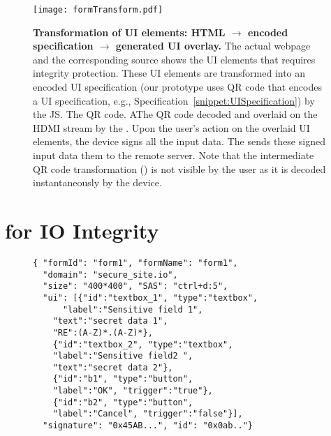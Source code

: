 \begin{figure*}[t]
\centering
\texttt{[image: formTransform.pdf]}
\caption{\textbf{Transformation of UI elements: HTML $\rightarrow$ encoded specification $\rightarrow$ \device generated UI overlay.} \one The actual webpage and the corresponding \html source shows the UI elements that requires integrity protection. \two These UI elements are transformed into an encoded UI specification (our \name prototype uses QR code that encodes a UI specification, e.g., Specification~\ref{snippet:UISpecification}) by the \name JS. The QR code. \three AThe QR code decoded and overlaid on the HDMI stream by the \device. \four Upon the user's action on the overlaid UI elements, the device signs all the input data. \five The \device sends these signed input data them to the remote server. Note that the intermediate QR code transformation (\two) is not visible by the user as it is decoded instantaneously by the device.}
\spacesave
\label{fig:transformation}
\end{figure*}

\section{\name for IO Integrity}
\label{sec:systemDesign}




\begin{figure}[t]
\scriptsize
\begin{lstlisting}[mathescape=true]
{ "formId": "form1", "formName": "form1",
  "domain": "secure_site.io",
  "size": "400*400", "SAS": "ctrl+d:5",
  "ui": [{"id":"textbox_1", "type":"textbox", 
      "label":"Sensitive field 1",
    "text":"secret data 1",
    "RE":(A-Z)*.(A-Z)*},
    {"id":"textbox_2", "type":"textbox",
    "label":"Sensitive field2 ",
    "text":"secret data 2"},
    {"id":"b1", "type":"button",
    "label":"OK", "trigger":"true"},    
    {"id":"b2", "type":"button",
    "label":"Cancel", "trigger":"false"}],
  "signature": "0x45AB...", "id": "0x0ab.."}
\end{lstlisting}
\spacesave
\end{figure}


